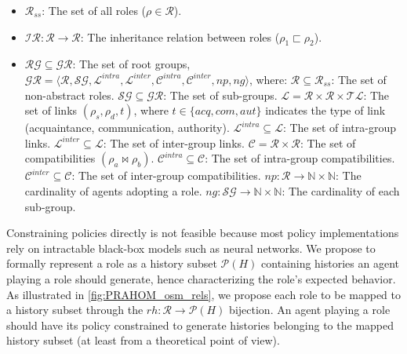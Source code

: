 \documentclass[sigconf,anonymous]{aamas}
\begin{document}
\begin{itemize}
  \item $\mathcal{R}_{ss}$: The set of all roles ($\rho \in \mathcal{R}$).
  \item $\mathcal{IR}: \mathcal{R} \rightarrow \mathcal{R}$: The inheritance relation between roles ($\rho_1 \sqsubset \rho_2$).
  \item $\mathcal{RG} \subseteq \mathcal{GR}$: The set of root groups, $\mathcal{GR} = \langle \mathcal{R}, \mathcal{SG}, \mathcal{L}^{intra}, \mathcal{L}^{inter}, \mathcal{C}^{intra}, \mathcal{C}^{inter}, \allowbreak np, ng \rangle$, where:
        $\mathcal{R} \subseteq \mathcal{R}_{ss}$: The set of non-abstract roles.
        $\mathcal{SG} \subseteq \mathcal{GR}$: The set of sub-groups.
        $\mathcal{L} = \mathcal{R} \times \mathcal{R} \times \mathcal{TL}$: The set of links $(\rho_s, \rho_d, t)$, where $t \in \{acq, com, aut\}$ indicates the type of link (acquaintance, communication, authority).
        $\mathcal{L}^{intra} \subseteq \mathcal{L}$: The set of intra-group links.
        $\mathcal{L}^{inter} \subseteq \mathcal{L}$: The set of inter-group links.
        $\mathcal{C} = \mathcal{R} \times \mathcal{R}$: The set of compatibilities $(\rho_a \bowtie \rho_b)$.
        $\mathcal{C}^{intra} \subseteq \mathcal{C}$: The set of intra-group compatibilities.
        $\mathcal{C}^{inter} \subseteq \mathcal{C}$: The set of inter-group compatibilities.
        $np: \mathcal{R} \rightarrow \mathbb{N} \times \mathbb{N}$: The cardinality of agents adopting a role.
        $ng: \mathcal{SG} \rightarrow \mathbb{N} \times \mathbb{N}$: The cardinality of each sub-group.
\end{itemize}

Constraining policies directly is not feasible because most policy implementations rely on intractable black-box models such as neural networks. We propose to formally represent a role as a history subset $\mathcal{P}(H)$ containing histories an agent playing a role should generate, hence characterizing the role's expected behavior. As illustrated in \autoref{fig:PRAHOM_osm_rels}, we propose each role to be mapped to a history subset through the $rh: \mathcal{R} \rightarrow \mathcal{P}(H)$ bijection. An agent playing a role should have its policy constrained to generate histories belonging to the mapped history subset (at least from a theoretical point of view).
\end{document}
